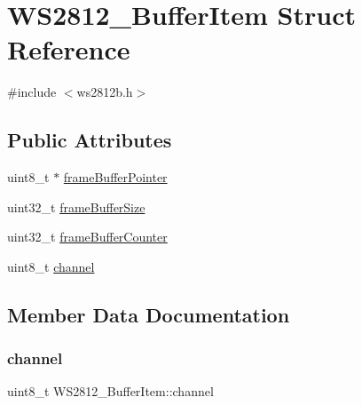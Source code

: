 \hypertarget{structWS2812__BufferItem}{}\section{W\+S2812\+\_\+\+Buffer\+Item Struct Reference}
\label{structWS2812__BufferItem}


{\ttfamily \#include $<$ws2812b.\+h$>$}

\subsection*{Public Attributes}
\begin{DoxyCompactItemize}
\item 
uint8\+\_\+t $\ast$ \hyperlink{structWS2812__BufferItem_ad2ae2e339fd2d30ebecca7b607e4c5fc}{frame\+Buffer\+Pointer}
\item 
uint32\+\_\+t \hyperlink{structWS2812__BufferItem_a038392b39bb54dcd9a9ff52877ce239d}{frame\+Buffer\+Size}
\item 
uint32\+\_\+t \hyperlink{structWS2812__BufferItem_a909215b1c7358f2e3c6a9a42c93e5c53}{frame\+Buffer\+Counter}
\item 
uint8\+\_\+t \hyperlink{structWS2812__BufferItem_ac4188420e9ab5a7f5584054cb7a3fa76}{channel}
\end{DoxyCompactItemize}


\subsection{Member Data Documentation}
\mbox{\label{structWS2812__BufferItem_ac4188420e9ab5a7f5584054cb7a3fa76}} 
\subsubsection{\texorpdfstring{channel}{channel}}
{\footnotesize\ttfamily uint8\+\_\+t W\+S2812\+\_\+\+Buffer\+Item\+::channel}

\mbox{\label{structWS2812__BufferItem_a909215b1c7358f2e3c6a9a42c93e5c53}} 
